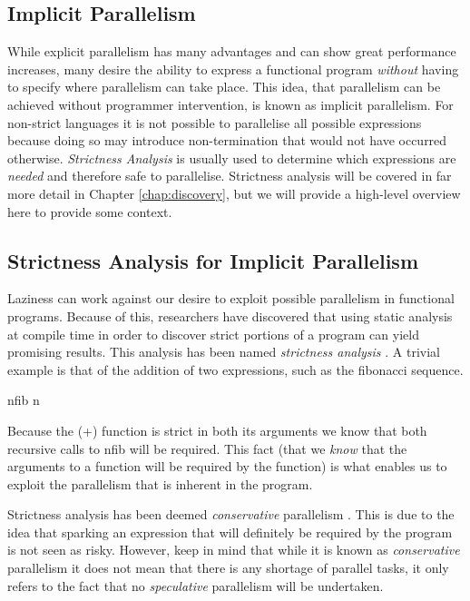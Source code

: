 \subsection{Implicit Parallelism}

While explicit parallelism has many advantages and can show great performance
increases, many desire the ability to express a functional program
\emph{without} having to specify where parallelism can take place. This idea,
that parallelism can be achieved without programmer intervention, is known as
implicit parallelism. For non-strict languages it is not possible to
parallelise all possible expressions because doing so may introduce
non-termination that would not have occurred otherwise. \emph{Strictness
Analysis} is usually used to determine which expressions are \emph{needed} and
therefore safe to parallelise.  Strictness analysis will be covered in far more
detail in Chapter \ref{chap:discovery}, but we will provide a high-level
overview here to provide some context.  

\subsection*{Strictness Analysis for Implicit Parallelism}

Laziness can work against our desire to exploit possible parallelism in
functional programs. Because of this, researchers have discovered that using
static analysis at compile time in order to discover strict portions of a
program can yield promising results. This analysis has been named
\emph{strictness analysis} \citep{ritabook, SPJ:PIFPL}. A trivial example is
that of the addition of two expressions, such as the fibonacci sequence.

\begin{haskell}
nfib n 
\end{haskell}

Because the \<(+)\> function is strict in both its arguments we know that
both recursive calls to \<nfib\> will be required. This fact (that we
\emph{know} that the arguments to a function will be required by the function)
is what enables us to exploit the parallelism that is inherent in the program.

Strictness analysis has been deemed \emph{conservative} parallelism
\citep{SPJ:PIFPL}. This is due to the idea that sparking an expression that
will definitely be required by the program is not seen as risky. However, keep
in mind that while it is known as \emph{conservative} parallelism it does not
mean that there is any shortage of parallel tasks, it only refers to the fact
that no \emph{speculative} parallelism will be undertaken.

